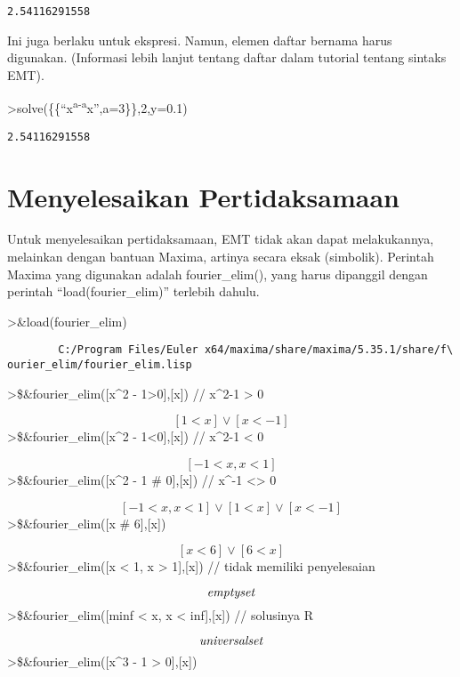 \documentclass[
]{book}
\begin{document}
\begin{verbatim}
2.54116291558
\end{verbatim}

Ini juga berlaku untuk ekspresi. Namun, elemen daftar bernama harus digunakan. (Informasi lebih lanjut tentang daftar dalam tutorial tentang sintaks EMT).

\textgreater solve(\{\{``x\textsuperscript{a-a}x'',a=3\}\},2,y=0.1)

\begin{verbatim}
2.54116291558
\end{verbatim}

\chapter{Menyelesaikan Pertidaksamaan}\label{menyelesaikan-pertidaksamaan}

Untuk menyelesaikan pertidaksamaan, EMT tidak akan dapat melakukannya, melainkan dengan bantuan Maxima, artinya secara eksak (simbolik). Perintah Maxima yang digunakan adalah fourier\_elim(), yang harus dipanggil dengan perintah ``load(fourier\_elim)'' terlebih dahulu.

\textgreater\&load(fourier\_elim)

\begin{verbatim}
        C:/Program Files/Euler x64/maxima/share/maxima/5.35.1/share/f\
ourier_elim/fourier_elim.lisp
\end{verbatim}

\textgreater\$\&fourier\_elim({[}x\^{}2 - 1\textgreater0{]},{[}x{]}) // x\^{}2-1 \textgreater{} 0

\[\left[ 1<x \right] \lor \left[ x<-1 \right]\]\textgreater\$\&fourier\_elim({[}x\^{}2 - 1\textless0{]},{[}x{]}) // x\^{}2-1 \textless{} 0

\[\left[ -1<x , x<1 \right]\]\textgreater\$\&fourier\_elim({[}x\^{}2 - 1 \# 0{]},{[}x{]}) // x\^{}-1 \textless\textgreater{} 0

\[\left[ -1<x , x<1 \right] \lor \left[ 1<x \right] \lor \left[ x<-1\right]\]\textgreater\$\&fourier\_elim({[}x \# 6{]},{[}x{]})

\[\left[ x<6 \right] \lor \left[ 6<x \right]\]\textgreater\$\&fourier\_elim({[}x \textless{} 1, x \textgreater{} 1{]},{[}x{]}) // tidak memiliki penyelesaian

\[{\it emptyset}\]\textgreater\$\&fourier\_elim({[}minf \textless{} x, x \textless{} inf{]},{[}x{]}) // solusinya R

\[{\it universalset}\]\textgreater\$\&fourier\_elim({[}x\^{}3 - 1 \textgreater{} 0{]},{[}x{]})
\end{document}
